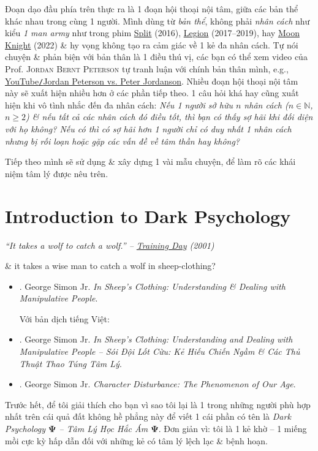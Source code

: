 \documentclass[12pt,oneside]{book}
\begin{document}
Đoạn dạo đầu phía trên thực ra là 1 đoạn hội thoại nội tâm, giữa các bản thể khác nhau trong cùng 1 người. Mình dùng từ {\it bản thể}, không phải {\it nhân cách} như kiểu {\it 1 man army} như trong phim \href{https://www.imdb.com/title/tt4972582/}{Split} (2016), \href{https://www.imdb.com/title/tt5114356/}{Legion} (2017--2019), hay \href{https://www.imdb.com/title/tt10234724}{Moon Knight} (2022) \& hy vọng không tạo ra cảm giác về 1 kẻ đa nhân cách. Tự nói chuyện \& phản biện với bản thân là 1 điều thú vị, các bạn có thể xem video của Prof. \textsc{Jordan Bernt Peterson} tự tranh luận với chính bản thân mình, e.g., \href{https://www.youtube.com/watch?v=buD2RM0xChM}{YouTube{\tt/}Jordan Peterson vs. Peter Jordanson}. Nhiều đoạn hội thoại nội tâm này sẽ xuất hiện nhiều hơn ở các phần tiếp theo. 1 câu hỏi khá hay cũng xuất hiện khi vô tình nhắc đến đa nhân cách: {\it Nếu 1 người sở hữu $n$ nhân cách ($n\in\mathbb{N}$, $n\ge 2$) \& nếu tất cả các nhân cách đó điều tốt, thì bạn có thấy sợ hãi khi đối diện với họ không? Nếu có thì có sợ hãi hơn 1 người chỉ có duy nhất 1 nhân cách nhưng bị rối loạn hoặc gặp các vấn đề về tâm thần hay không?}

Tiếp theo mình sẽ sử dụng \& xây dựng 1 vài mẫu chuyện, để làm rõ các khái niệm tâm lý được nêu trên.

\section{Introduction to Dark Psychology}

\begin{flushright}\it
	``It takes a wolf to catch a wolf.'' -- \href{https://www.imdb.com/title/tt0139654/}{Training Day} (2001)
\end{flushright}
\& it takes a wise man to catch a wolf in sheep-clothing?

\begin{itemize}
	\item \cite{Simon_sheep}. {\sc George Simon Jr.} {\it In Sheep's Clothing: Understanding \& Dealing with Manipulative People}.
	
	Với bản dịch tiếng Việt:
	\item \cite{Simon_sheep_VN}. {\sc George Simon Jr.} {\it In Sheep's Clothing: Understanding and Dealing with Manipulative People -- Sói Đội Lốt Cừu: Kẻ Hiếu Chiến Ngầm \& Các Thủ Thuật Thao Túng Tâm Lý}.
	
	\item \cite{Simon_character}. {\sc George Simon Jr.} {\it Character Disturbance: The Phenomenon of Our Age}.
\end{itemize}
Trước hết, để tôi giải thích cho bạn vì sao tôi lại là 1 trong những người phù hợp nhất trên cái quả đất không hề phẳng này để viết 1 cái phần có tên là {\it Dark Psychology $\boldsymbol{\Psi}$ -- Tâm Lý Học Hắc Ám $\boldsymbol{\Psi}$}. Đơn giản vì: tôi là 1 kẻ khờ -- 1 miếng mồi cực kỳ hấp dẫn đối với những kẻ có tâm lý lệch lạc \& bệnh hoạn.
\end{document}
